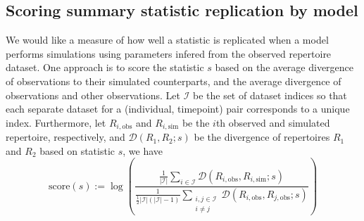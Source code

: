 \documentclass{article}
\begin{document}
\subsection*{Scoring summary statistic replication by model}
We would like a measure of how well a statistic is replicated when a model performs simulations using parameters infered from the observed repertoire dataset.
One approach is to score the statistic $s$ based on the average divergence of observations to their simulated counterparts, and the average divergence of observations and other observations.
Let $\mathcal I$ be the set of dataset indices so that each separate dataset for a (individual, timepoint) pair corresponds to a unique index.
Furthermore, let $R_{i, \text{obs}}$ and $R_{i, \text{sim}}$ be the $i$th observed and simulated repertoire, respectively, and $\mathcal D(R_1, R_2; s)$ be the divergence of repertoires $R_1$ and $R_2$ based on statistic $s$, we have
\begin{equation}
    \text{score}(s) := \log \left( \frac{ \frac{1}{|\mathcal I|} \sum_{i \in \mathcal I} \mathcal D \left( R_{i, \text{obs}}, R_{i, \text{sim}} ; s\right) }
    { \frac{1}{\frac{1}{2} |\mathcal I|\left(|\mathcal I| - 1\right)}
        \sum_{\substack{i, j \in \mathcal I \\ i \ne j}} \mathcal D\left(R_{i, \text{obs}}, R_{j, \text{obs}}; s\right) } \right)
\end{equation}
\end{document}
